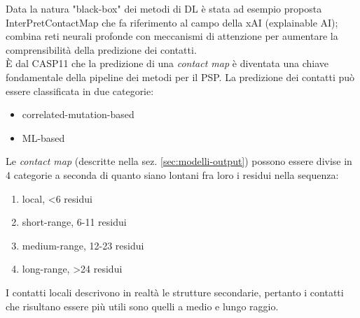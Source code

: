 \par Data la natura "black-box" dei metodi di DL è stata ad esempio proposta InterPretContactMap che fa riferimento al campo della xAI (explainable AI); combina reti neurali profonde con meccanismi di attenzione per aumentare la comprensibilità della predizione dei contatti. \\

È dal CASP11 che la predizione di una \textit{contact map} è diventata una chiave fondamentale della pipeline dei metodi per il PSP. La predizione dei contatti può essere classificata in due categorie:

\begin{itemize}
	\item correlated-mutation-based
	\item ML-based
\end{itemize}

Le \textit{contact map} (descritte nella sez. \ref{sec:modelli-output}) possono essere divise in 4 categorie a seconda di quanto siano lontani fra loro i residui nella sequenza:

\begin{enumerate}
	\item local, <6 residui
	\item short-range, 6-11 residui
	\item medium-range, 12-23 residui
	\item long-range, >24 residui
\end{enumerate}

I contatti locali descrivono in realtà le strutture secondarie, pertanto i contatti che risultano essere più utili sono quelli a medio e lungo raggio.

